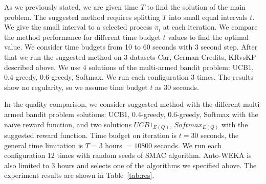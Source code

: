 \documentclass{svproc}
\begin{document}
As we previously stated, we are given time $T$ to find the solution of the main problem. The suggested method requires splitting $T$ into small equal intervals $t$. We give the small interval to a selected process $\pi_i$ at each iteration.
%
We compare the method performance for different time budget $t$ values to find the optimal value. We consider time budgets from 10 to 60 seconds with 3 second step. After that we run the suggested method on 3 datasets Car, German Credits, KRvsKP described above. We use 4 solutions of the multi-armed bandit problem: UCB1, 0.4-greedy, 0.6-greedy, Softmax. We run each configuration 3 times. The results show no regularity, so we assume time budget $t$ as 30 seconds. 

In the quality comparison, we consider suggested method with the different multi-armed bandit problem solutions: UCB1, 0.4-greedy, 0.6-greedy, Softmax with the na\"ive reward function, and two solutions $UCB1_{E(Q)}$, $Softmax_{E(Q)}$ with the suggested reward function. Time budget on iteration is $t = 30$ seconds, the general time limitation is $T = 3$ hours $= 10800$ seconds. We run each configuration 12 times with random seeds of SMAC algorithm. Auto-WEKA is also limited to 3 hours and selects one of the algorithms we specified above. The experiment results are shown in Table~\ref{tab:res}. 
\end{document}

